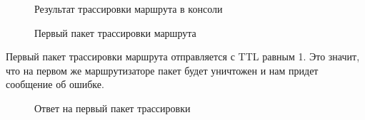 \documentclass[a4paper, 14pt,russian]{article}
\begin{document}
	\begin{figure}[h!]
		\caption{Результат трассировки маршрута в консоли}
		\label{img:tracert1}
	\end{figure}

	\begin{figure}[h!]
		\caption{Первый пакет трассировки маршрута}
		\label{img:tracert2}
	\end{figure}
	
	Первый пакет трассировки маршрута отправляется с TTL равным 1. Это значит, что на первом же маршрутизаторе пакет будет уничтожен и нам придет сообщение об ошибке.

	\begin{figure}[h!]
		\caption{Ответ на первый пакет трассировки}
		\label{img:tracert_ans}
	\end{figure}
\end{document}
